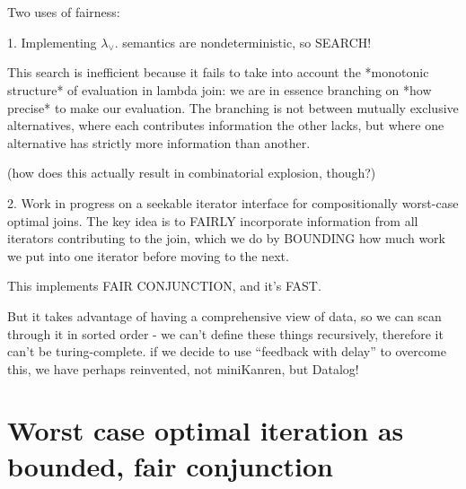\documentclass[acmsmall,screen,review,anonymous,dvipsnames]{acmart}
\begin{document}
Two uses of fairness:

1. Implementing $\lambda_{\vee}$.
   semantics are nondeterministic,
   so SEARCH!

   This search is inefficient because it fails to take into account the *monotonic structure* of evaluation in lambda join: we are in essence branching on *how precise* to make our evaluation.
   The branching is not between mutually exclusive alternatives, where each contributes information the other lacks, but where one alternative has strictly more information than another.

   (how does this actually result in combinatorial explosion, though?)

2. Work in progress on a seekable iterator interface for compositionally worst-case optimal joins.
   The key idea is to FAIRLY incorporate information from all iterators contributing to the join,
   which we do by BOUNDING how much work we put into one iterator before moving to the next.

   This implements FAIR CONJUNCTION, and it's FAST.

   But it takes advantage of having a comprehensive view of data, so we can scan through it in sorted order - we can't define these things recursively, therefore it can't be turing-complete.
if we decide to use ``feedback with delay'' to overcome this, we have perhaps reinvented, not miniKanren, but Datalog!


\section{Worst case optimal iteration as bounded, fair conjunction}



\end{document}
